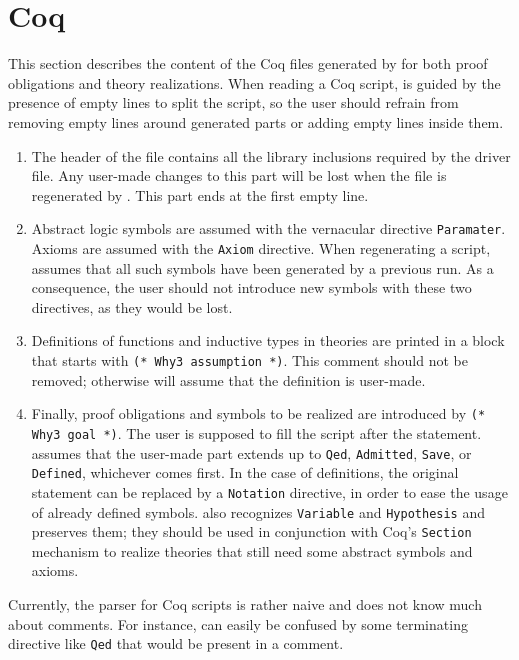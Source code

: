 
\section{Coq}
\label{sec:coq}

This section describes the content of the Coq files generated by \why for
both proof obligations and theory realizations. When reading a Coq
script, \why is guided by the presence of empty lines to split the
script, so the user should refrain from removing empty lines around
generated parts or adding empty lines inside them.

\begin{enumerate}
\item	The header of the file contains all the library inclusions
	required by the driver file. Any user-made changes to this part
	will be lost when the file is regenerated by \why. This part ends
	at the first empty line.
\item	Abstract logic symbols are assumed with the vernacular directive
	\verb+Paramater+. Axioms are assumed with the \verb+Axiom+
	directive. When regenerating a script, \why assumes that all such
	symbols have been generated by a previous run. As a consequence,
	the user should not introduce new symbols with these two
	directives, as they would be lost.
\item	Definitions of functions and inductive types in theories are
	printed in a block that starts with \verb+(* Why3 assumption *)+.
	This comment should not be removed; otherwise \why will assume
	that the definition is user-made.
\item	Finally, proof obligations and symbols to be realized are
	introduced by \verb+(* Why3 goal *)+. The user is supposed to
	fill the script after the statement. \why assumes that the
	user-made part extends up to \verb+Qed+, \verb+Admitted+,
	\verb+Save+, or \verb+Defined+, whichever comes first. In the
	case of definitions, the original statement can be replaced by
	a \verb+Notation+ directive, in order to ease the usage of
	already defined symbols. \why also recognizes \verb+Variable+
	and \verb+Hypothesis+ and preserves them; they should be used in
	conjunction with Coq's \verb+Section+ mechanism to realize
	theories that still need some abstract symbols and axioms.
\end{enumerate}

Currently, the parser for Coq scripts is rather naive and does not know
much about comments. For instance, \why can easily be confused by
some terminating directive like \verb+Qed+ that would be present in a
comment.


